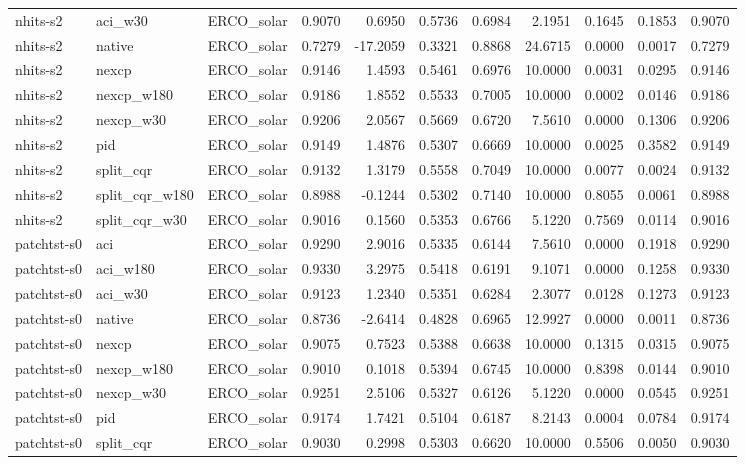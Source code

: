 \begin{tabular}{lllrrrrrrrr}
nhits-s2 & aci_w30 & ERCO_solar & 0.9070 & 0.6950 & 0.5736 & 0.6984 & 2.1951 & 0.1645 & 0.1853 & 0.9070 \\
nhits-s2 & native & ERCO_solar & 0.7279 & -17.2059 & 0.3321 & 0.8868 & 24.6715 & 0.0000 & 0.0017 & 0.7279 \\
nhits-s2 & nexcp & ERCO_solar & 0.9146 & 1.4593 & 0.5461 & 0.6976 & 10.0000 & 0.0031 & 0.0295 & 0.9146 \\
nhits-s2 & nexcp_w180 & ERCO_solar & 0.9186 & 1.8552 & 0.5533 & 0.7005 & 10.0000 & 0.0002 & 0.0146 & 0.9186 \\
nhits-s2 & nexcp_w30 & ERCO_solar & 0.9206 & 2.0567 & 0.5669 & 0.6720 & 7.5610 & 0.0000 & 0.1306 & 0.9206 \\
nhits-s2 & pid & ERCO_solar & 0.9149 & 1.4876 & 0.5307 & 0.6669 & 10.0000 & 0.0025 & 0.3582 & 0.9149 \\
nhits-s2 & split_cqr & ERCO_solar & 0.9132 & 1.3179 & 0.5558 & 0.7049 & 10.0000 & 0.0077 & 0.0024 & 0.9132 \\
nhits-s2 & split_cqr_w180 & ERCO_solar & 0.8988 & -0.1244 & 0.5302 & 0.7140 & 10.0000 & 0.8055 & 0.0061 & 0.8988 \\
nhits-s2 & split_cqr_w30 & ERCO_solar & 0.9016 & 0.1560 & 0.5353 & 0.6766 & 5.1220 & 0.7569 & 0.0114 & 0.9016 \\
patchtst-s0 & aci & ERCO_solar & 0.9290 & 2.9016 & 0.5335 & 0.6144 & 7.5610 & 0.0000 & 0.1918 & 0.9290 \\
patchtst-s0 & aci_w180 & ERCO_solar & 0.9330 & 3.2975 & 0.5418 & 0.6191 & 9.1071 & 0.0000 & 0.1258 & 0.9330 \\
patchtst-s0 & aci_w30 & ERCO_solar & 0.9123 & 1.2340 & 0.5351 & 0.6284 & 2.3077 & 0.0128 & 0.1273 & 0.9123 \\
patchtst-s0 & native & ERCO_solar & 0.8736 & -2.6414 & 0.4828 & 0.6965 & 12.9927 & 0.0000 & 0.0011 & 0.8736 \\
patchtst-s0 & nexcp & ERCO_solar & 0.9075 & 0.7523 & 0.5388 & 0.6638 & 10.0000 & 0.1315 & 0.0315 & 0.9075 \\
patchtst-s0 & nexcp_w180 & ERCO_solar & 0.9010 & 0.1018 & 0.5394 & 0.6745 & 10.0000 & 0.8398 & 0.0144 & 0.9010 \\
patchtst-s0 & nexcp_w30 & ERCO_solar & 0.9251 & 2.5106 & 0.5327 & 0.6126 & 5.1220 & 0.0000 & 0.0545 & 0.9251 \\
patchtst-s0 & pid & ERCO_solar & 0.9174 & 1.7421 & 0.5104 & 0.6187 & 8.2143 & 0.0004 & 0.0784 & 0.9174 \\
patchtst-s0 & split_cqr & ERCO_solar & 0.9030 & 0.2998 & 0.5303 & 0.6620 & 10.0000 & 0.5506 & 0.0050 & 0.9030 \\

\end{tabular}
